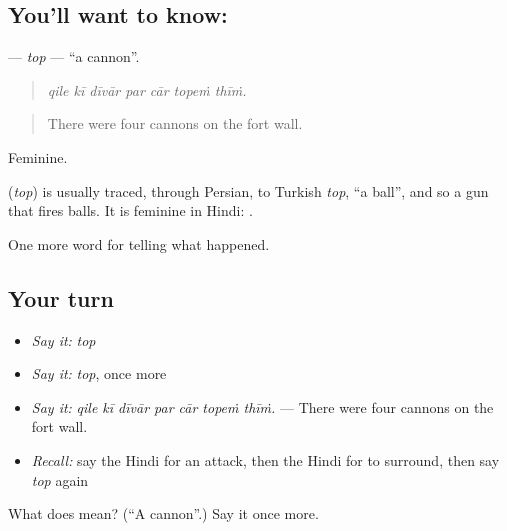 \subsection*{You'll want to know: }
\textbf{} — \emph{top} — \textquotedblleft{}a cannon\textquotedblright{}.

\begin{quote}
      
\end{quote}

\begin{quote}
\emph{qile kī dīvār par cār topeṁ thīṁ.}
\end{quote}

\begin{quote}
There were four cannons on the fort wall.
\end{quote}

Feminine.

\begin{cousinweb}
\textbf{} (\emph{top}) is usually traced, through Persian, to Turkish \emph{top}, \textquotedblleft{}a ball\textquotedblright{}, and so a gun that fires balls. It is feminine in Hindi: \textbf{ }.
\end{cousinweb}

\begin{grammarlens}[title={What you've built}]
One more word for telling what happened.
\end{grammarlens}

\subsection*{Your turn}
\begin{itemize}
\raggedright
  \item \emph{Say it:} \emph{top}
  \item \emph{Say it:} \emph{top}, once more
  \item \emph{Say it:} \emph{qile kī dīvār par cār topeṁ thīṁ.} — There were four cannons on the fort wall.
  \item \emph{Recall:} say the Hindi for an attack, then the Hindi for to surround, then say \emph{top} again
\end{itemize}

\begin{tcolorbox}[breakable,colback=teal!4,colframe=teal!35!black,title={Before you move on}]
What does  mean? (\textquotedblleft{}A cannon\textquotedblright{}.) Say it once more.
\end{tcolorbox}
